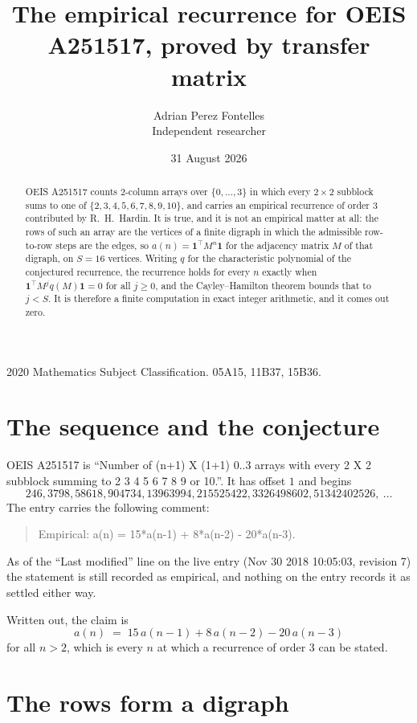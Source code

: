 \documentclass[11pt,a4paper]{article}
\title{The empirical recurrence for OEIS A251517, proved by transfer matrix}
\author{Adrian Perez Fontelles\\ \small Independent researcher}
\date{31 August 2026}
\theoremstyle{plain}
\theoremstyle{definition}
\begin{document}
\maketitle

\begin{abstract}
OEIS A251517 counts $2$-column arrays over $\{0,\dots,3\}$ in which every
$2\times2$ subblock sums to one of $\{2, 3, 4, 5, 6, 7, 8, 9, 10\}$, and carries an empirical
recurrence of order $3$ contributed by R.~H.~Hardin. It is true, and it is not an
empirical matter at all: the rows of such an array are the vertices of a finite digraph in
which the admissible row-to-row steps are the edges, so $a(n)=\mathbf{1}^{\!\top}M^{n}
\mathbf{1}$ for the adjacency matrix $M$ of that digraph, on $S=16$ vertices. Writing
$q$ for the characteristic polynomial of the conjectured recurrence, the recurrence holds
for every $n$ exactly when $\mathbf{1}^{\!\top}M^{j}q(M)\mathbf{1}=0$ for all
$j\ge0$, and the Cayley--Hamilton theorem bounds that to $j<S$. It is therefore a finite
computation in exact integer arithmetic, and it comes out zero.
\end{abstract}

\noindent\small 2020 Mathematics Subject Classification. 05A15, 11B37, 15B36.\normalsize

\section{The sequence and the conjecture}

OEIS A251517 is ``Number of (n+1) X (1+1) 0..3 arrays with every 2 X 2 subblock summing to 2 3 4 5 6 7 8 9 or 10.''. It has offset $1$
and begins
\[
246, 3798, 58618, 904734, 13963994, 215525422, 3326498602, 51342402526,\ \dots
\]
The entry carries the following comment:
\begin{quote}\small
Empirical: a(n) = 15*a(n-1) + 8*a(n-2) - 20*a(n-3).
\end{quote}
As of the ``Last modified'' line on the live entry (Nov 30 2018 10:05:03, revision 7) the statement is
still recorded as empirical, and nothing on the entry records it as settled either way.

Written out, the claim is
\begin{equation}\label{eq:conj}
a(n)\;=\;15\,a(n-1) + 8\,a(n-2) - 20\,a(n-3)
\end{equation}
for all $n>2$, which is every $n$ at which a recurrence of order $3$ can be
stated.

\section{The rows form a digraph}
\end{document}
